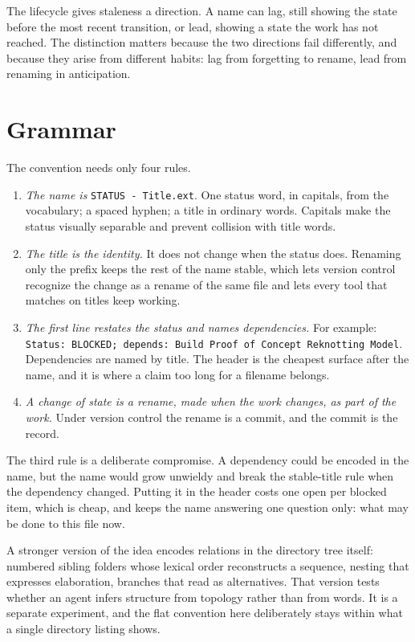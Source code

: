 \documentclass[11pt]{article}
\begin{document}
The lifecycle gives staleness a direction. A name can lag, still showing the state before the most recent transition, or lead, showing a state the work has not reached. The distinction matters because the two directions fail differently, and because they arise from different habits: lag from forgetting to rename, lead from renaming in anticipation.

\section{Grammar}\label{sec:grammar}

The convention needs only four rules.

\begin{enumerate}[leftmargin=2em,itemsep=3pt]
\item \emph{The name is} \texttt{STATUS - Title.ext}. One status word, in capitals, from the vocabulary; a spaced hyphen; a title in ordinary words. Capitals make the status visually separable and prevent collision with title words.
\item \emph{The title is the identity.} It does not change when the status does. Renaming only the prefix keeps the rest of the name stable, which lets version control recognize the change as a rename of the same file and lets every tool that matches on titles keep working.
\item \emph{The first line restates the status and names dependencies.} For example: \texttt{Status: BLOCKED; depends: Build Proof of Concept Reknotting Model}. Dependencies are named by title. The header is the cheapest surface after the name, and it is where a claim too long for a filename belongs.
\item \emph{A change of state is a rename, made when the work changes, as part of the work.} Under version control the rename is a commit, and the commit is the record.
\end{enumerate}

The third rule is a deliberate compromise. A dependency could be encoded in the name, but the name would grow unwieldy and break the stable-title rule when the dependency changed. Putting it in the header costs one open per blocked item, which is cheap, and keeps the name answering one question only: what may be done to this file now.

A stronger version of the idea encodes relations in the directory tree itself: numbered sibling folders whose lexical order reconstructs a sequence, nesting that expresses elaboration, branches that read as alternatives. That version tests whether an agent infers structure from topology rather than from words. It is a separate experiment, and the flat convention here deliberately stays within what a single directory listing shows.
\end{document}
